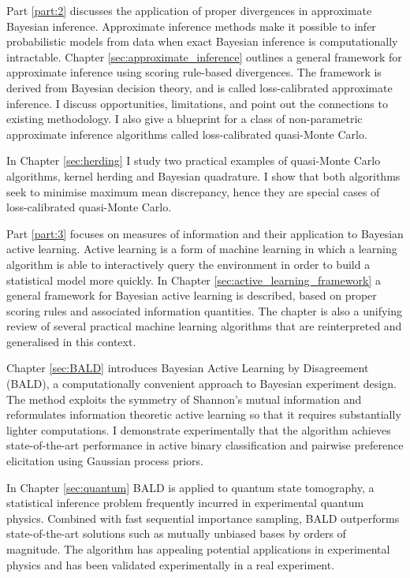 Part \ref{part:2} discusses the application of proper divergences in approximate Bayesian inference. Approximate inference methods make it possible to infer probabilistic models from data when exact Bayesian inference is computationally intractable. Chapter \ref{sec:approximate_inference} outlines a general framework for approximate inference using scoring rule-based divergences. The framework is derived from Bayesian decision theory, and is called loss-calibrated approximate inference. I discuss opportunities, limitations, and point out the connections to existing methodology. I also give a blueprint for a class of non-parametric approximate inference algorithms called loss-calibrated quasi-Monte Carlo.

In Chapter \ref{sec:herding} I study two practical examples of quasi-Monte Carlo algorithms, kernel herding and Bayesian quadrature. I show that both algorithms seek to minimise maximum mean discrepancy, hence they are special cases of loss-calibrated quasi-Monte Carlo. 

Part \ref{part:3} focuses on measures of information and their application to Bayesian active learning. Active learning is a form of machine learning in which a learning algorithm is able to interactively query the environment in order to build a statistical model more quickly. In Chapter \ref{sec:active_learning_framework} a general framework for Bayesian active learning is described, based on proper scoring rules and associated information quantities. The chapter is also a unifying review of several practical machine learning algorithms that are reinterpreted and generalised in this context.

Chapter \ref{sec:BALD} introduces Bayesian Active Learning by Disagreement (BALD), a computationally convenient approach to Bayesian experiment design. The method exploits the symmetry of Shannon's mutual information and reformulates information theoretic active learning so that it requires substantially lighter computations. I demonstrate experimentally that the algorithm achieves state-of-the-art performance in active binary classification and pairwise preference elicitation using Gaussian process priors.

In Chapter \ref{sec:quantum} BALD is applied to quantum state tomography, a statistical inference problem frequently incurred in experimental quantum physics. Combined with fast sequential importance sampling, BALD outperforms state-of-the-art solutions such as mutually unbiased bases by orders of magnitude. The algorithm has appealing potential applications in experimental physics and has been validated experimentally in a real experiment.